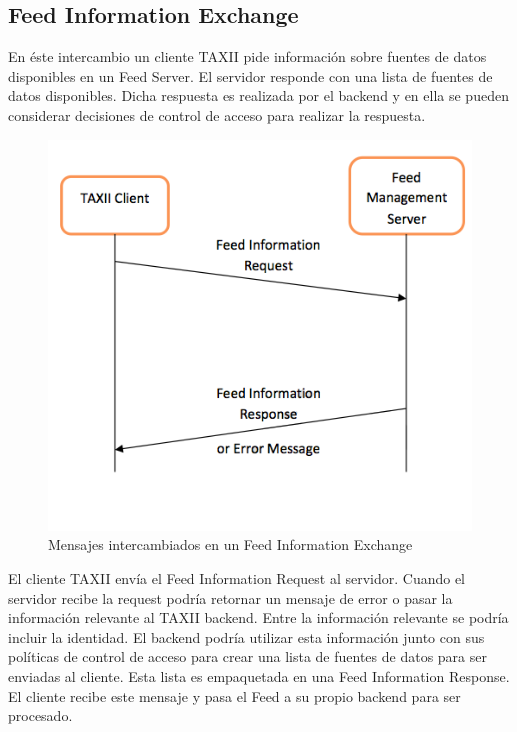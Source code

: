 \subsection{Feed Information Exchange}

En éste intercambio un cliente TAXII pide información sobre fuentes de datos disponibles en 
un Feed Server. El servidor responde con una lista de fuentes de datos 
disponibles. Dicha respuesta es realizada por el backend y en ella se pueden considerar 
decisiones de control de acceso para realizar la respuesta.

\begin{figure}[ht!]
  \centering
    \includegraphics[width=150mm]{./images/FeedInformationExchange.png}
    \caption{Mensajes intercambiados en un Feed Information Exchange \protect\cite{b1}}
\end{figure}

El cliente TAXII envía el Feed Information Request al 
servidor. Cuando el servidor recibe la request podría retornar un mensaje de 
error o pasar la información relevante al TAXII backend. Entre la información 
relevante se podría incluir la identidad. El backend podría utilizar esta 
información junto con sus políticas de control de acceso para crear una lista de 
fuentes de datos para ser enviadas al cliente. Esta lista es empaquetada en una 
Feed Information Response. El cliente recibe este mensaje y pasa el Feed a su 
propio backend para ser procesado.

